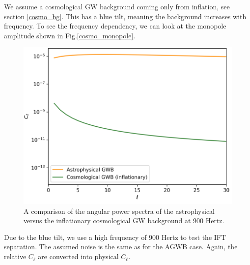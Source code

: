 We assume a cosmological GW background coming only from inflation, see section \ref{cosmo_bg}. This has a blue tilt, meaning the background increases with frequency. To see the frequency dependency, we can look at the monopole amplitude shown in Fig.\ref{cosmo_monopole}.

\begin{figure}[h]
    \centering
    \includegraphics[width=0.6\linewidth]{Images/astro_vs_cosmo.png}
    \caption{A comparison of the angular power spectra of the astrophysical versus the inflationary cosmological GW background at 900 Hertz.}
    \label{astro_cosmo}
\end{figure} 

Due to the blue tilt, we use a high frequency of 900 Hertz to test the IFT separation. The assumed noise is the same as for the AGWB case. Again, the relative $C_\ell$ are converted into physical $C_\ell$.

